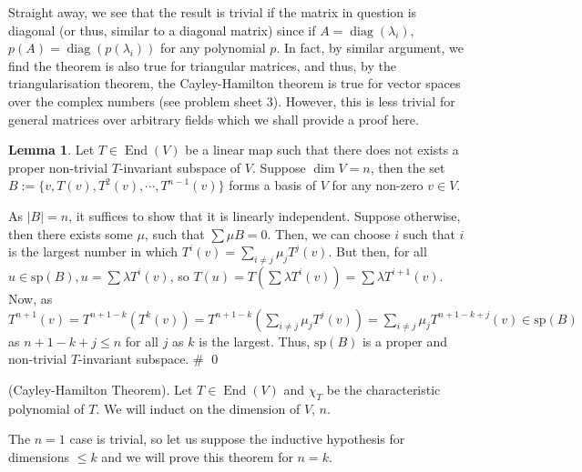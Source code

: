\documentclass[
]{article}
\theoremstyle{definition}
\newtheorem{lemma}{Lemma}[section]
\theoremstyle{definition}
\begin{document}
Straight away, we see that the result is trivial if the matrix in
question is diagonal (or thus, similar to a diagonal matrix) since if
\(A = \mathop{\mathrm{diag}}(\lambda_i)\),
\(p(A) = \mathop{\mathrm{diag}}(p(\lambda_i))\) for any polynomial
\(p\). In fact, by similar argument, we find the theorem is also true
for triangular matrices, and thus, by the triangularisation theorem, the
Cayley-Hamilton theorem is true for vector spaces over the complex
numbers (see problem sheet 3). However, this is less trivial for general
matrices over arbitrary fields which we shall provide a proof here.

\begin{lemma}\label{no_proper}
  Let \(T \in \mathop{\mathrm{End}}(V)\) be a linear map such that there does not exists a proper 
  non-trivial \(T\)-invariant subspace of \(V\). Suppose \(\dim V = n\), then 
  the set \(B := \{v, T(v), T^2(v), \cdots, T^{n - 1}(v)\}\) forms a basis of 
  \(V\) for any non-zero \(v \in V\). 
\end{lemma}
\proof

As \(\left| B \right| = n\), it suffices to show that it is linearly
independent. Suppose otherwise, then there exists some \(\mu\), such
that \(\sum \mu B = 0\). Then, we can choose \(i\) such that \(i\) is
the largest number in which \(T^i(v) = \sum_{i \neq j} \mu_j T^j(v)\).
But then, for all \(u \in \text{sp}(B), u = \sum \lambda T^i(v)\), so
\(T(u) =  T(\sum \lambda T^i(v)) = \sum \lambda T^{i + 1}(v)\). Now, as
\(T^{n + 1}(v)  = T^{n + 1 - k}(T^k(v)) = T^{n + 1 - k}(\sum_{i \neq j} \mu_j T^j(v))  = \sum_{i \neq j} \mu_j T^{n + 1 - k + j}(v) \in \text{sp}(B)\)
as \(n + 1 - k + j \le n\) for all \(j\) as \(k\) is the largest. Thus,
\(\text{sp}(B)\) is a proper and non-trivial \(T\)-invariant subspace.
\# \qed

\proof (Cayley-Hamilton Theorem). Let \(T \in \mathop{\mathrm{End}}(V)\)
and \(\chi_T\) be the characteristic polynomial of \(T\). We will induct
on the dimension of \(V\), \(n\).

The \(n = 1\) case is trivial, so let us suppose the inductive
hypothesis for dimensions \(\le k\) and we will prove this theorem for
\(n = k\).
\end{document}
